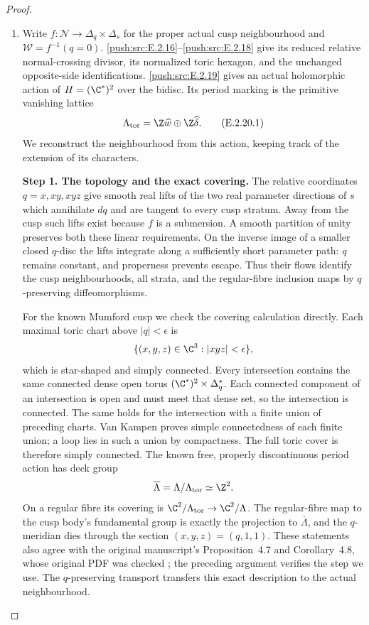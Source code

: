 \begin{proof}
\begin{enumerate}[label={$\langle1\rangle$\arabic*.},leftmargin=*]
\item 
Write $f:\mathcal N\to\Delta_q\times\Delta_s$
for the proper actual cusp neighbourhood and
$\mathcal W=f^{-1}(q=0)$.  \ref{push:src:E.2.16}--\ref{push:src:E.2.18}
give its reduced relative normal-crossing
divisor, its normalized toric hexagon, and
the unchanged opposite-side identifications.
\ref{push:src:E.2.19} gives an actual holomorphic action
of $H=(\C^*)^2$ over the bidisc.  Its
period marking is the primitive vanishing
lattice
\[
 \Lambda_{\rm tor}
   =\Z\widehat w\oplus\Z\widehat\delta.
 \tag{E.2.20.1}
\]
We reconstruct the neighbourhood from
this action, keeping track of the
extension of its characters.

\noindent\textbf{Step 1. The topology and the exact covering.}
The relative coordinates
$q=x,xy,xyz$ give smooth real lifts
of the two real parameter directions
of $s$ which annihilate $dq$ and
are tangent to every cusp stratum.
Away from the cusp such lifts exist
because $f$ is a submersion.
A smooth partition of unity preserves
both these linear requirements.
On the inverse image of a smaller
closed $q$-disc the lifts integrate
along a sufficiently short parameter
path: $q$ remains constant, and
properness prevents escape.
Thus their flows identify the cusp
neighbourhoods, all strata, and
the regular-fibre inclusion maps
by $q$-preserving diffeomorphisms.

For the known Mumford cusp we
check the covering calculation
directly.  Each maximal toric
chart above $|q|<\epsilon$ is
\[
 \{(x,y,z)\in\C^3:|xyz|<\epsilon\},
\]
which is star-shaped and simply
connected.  Every intersection
contains the same connected dense
open torus $(\C^*)^2\times\Delta_q^*$.
Each connected component of an
intersection is open and must meet
that dense set, so the intersection
is connected.  The same holds for
the intersection with a finite
union of preceding charts.
Van Kampen proves simple
connectedness of each finite
union; a loop lies in such a
union by compactness.  The full
toric cover is therefore simply
connected.  The known free,
properly discontinuous period
action has deck group
\[
 \overline\Lambda=\Lambda/\Lambda_{\rm tor}
                 \simeq\Z^2.
\]
On a regular fibre its covering
is $\C^2/\Lambda_{\rm tor}\to
\C^2/\Lambda$.  The regular-fibre
map to the cusp body's fundamental
group is exactly the projection
to $\overline\Lambda$, and the
$q$-meridian dies through the
section $(x,y,z)=(q,1,1)$.
These statements also agree
with the original manuscript's
Proposition~4.7 and Corollary~4.8,
whose original PDF was checked
\cite[p.~30]{AC26Root}; the
preceding argument verifies
the step we use.  The
$q$-preserving transport transfers
this exact description to the
actual neighbourhood.


\end{enumerate}
\end{proof}
